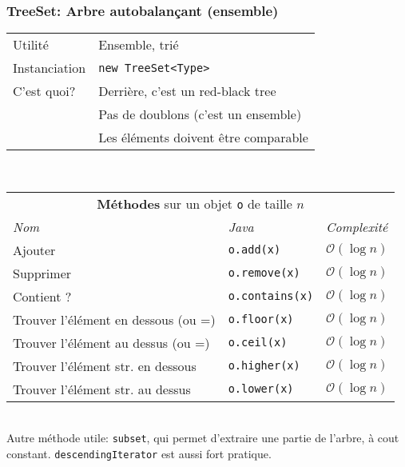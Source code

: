 \documentclass[8pt,aspectratio=169]{beamer}
\begin{document}
\begin{frame}
\frametitle{TreeSet: Arbre autobalançant (ensemble)}
\centering
\begin{tabular}{ll}
	Utilité & Ensemble, trié\\
	Instanciation & \texttt{new TreeSet<Type>}\\
	C'est quoi? & Derrière, c'est un red-black tree\\
	& \color{red} Pas de doublons (c'est un ensemble)\\
	& \color{red} Les éléments doivent être comparable
	
\end{tabular}\\
\centering
\begin{tabular}{lll}
	\multicolumn{3}{c}{\textbf{Méthodes} sur un objet \texttt{o} de taille $n$} \\
	\textit{Nom} & \textit{Java} & \textit{Complexité} \\
	Ajouter & \texttt{o.add(x)} & $\mathcal{O}(\log n)$\\
	Supprimer & \texttt{o.remove(x)} & $\mathcal{O}(\log n)$\\
	Contient ? & \texttt{o.contains(x)} & $\mathcal{O}(\log n)$\\
	Trouver l'élément en dessous (ou =) & \texttt{o.floor(x)} & $\mathcal{O}(\log n)$\\
	Trouver l'élément au dessus (ou =) & \texttt{o.ceil(x)} & $\mathcal{O}(\log n)$\\
	Trouver l'élément str. en dessous & \texttt{o.higher(x)} & $\mathcal{O}(\log n)$\\
	Trouver l'élément str. au dessus & \texttt{o.lower(x)} & $\mathcal{O}(\log n)$\\
\end{tabular}\\
\vspace{0.5cm}
\color{blue} Autre méthode utile: \texttt{subset}, qui permet d'extraire une partie de l'arbre, à cout constant. \texttt{descendingIterator} est aussi fort pratique.
\end{frame}
\end{document}
